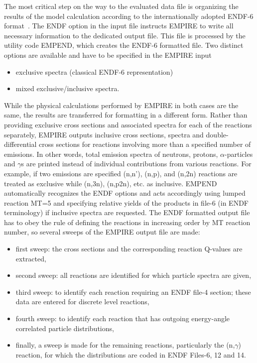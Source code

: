 The most critical step on the way to the evaluated data file is organizing the results of the model calculation according to the internationally adopted ENDF-6 format~\cite{Herman:05a}.
The ENDF option in the input file instructs EMPIRE to
write all necessary information to the dedicated output file.
This file is processed by the utility
code EMPEND, which creates the ENDF-6 formatted file.
Two distinct options are available and have to be specified in the EMPIRE input
\begin{itemize}
\item exclusive spectra (classical ENDF-6 representation)
\item mixed exclusive/inclusive spectra.
\end{itemize}
While the physical calculations performed by EMPIRE in both
cases are the same, the results are transferred for formatting in
a different form. Rather than providing exclusive cross sections and
associated spectra for each of the reactions separately, EMPIRE outputs
inclusive cross sections, spectra and double-differential cross sections for
reactions involving more than a specified number of emissions.
In other words, total emission spectra of neutrons, protons, $\alpha$-particles
and $\gamma$s are printed instead of individual contributions from
various reactions. For example, if two
emissions are specified (n,n'), (n,p), and (n,2n) reactions are treated as exclusive while
(n,3n), (n,p2n), etc. as inclusive.
EMPEND automatically recognizes
the ENDF options and acts accordingly using lumped reaction MT=5 and specifying relative
yields of the products in file-6 (in ENDF terminology) if inclusive spectra are requested.
The ENDF formatted
output file has to obey the rule of defining the reactions in increasing
order by MT reaction number, so several sweeps of the EMPIRE output file
are made:
\begin{itemize}
\item first sweep: the cross sections and the corresponding reaction Q-values
are extracted,
\item second sweep: all reactions are identified for which particle spectra
are given,
\item third sweep: to identify each reaction requiring an ENDF file-4 section;
these data are entered for discrete level reactions,
\item fourth sweep: to identify each reaction that has outgoing energy-angle
correlated particle distributions,
\item finally, a sweep is made for the remaining reactions, particularly
the (n,$\gamma$) reaction, for which the distributions are coded
in ENDF Files-6, 12 and 14.
\end{itemize}

